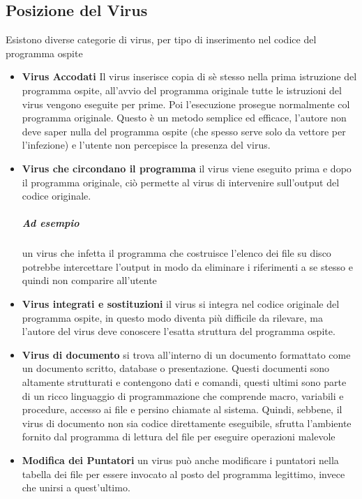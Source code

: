 \subsection{Posizione del Virus}
Esistono diverse categorie di virus, per tipo di inserimento nel codice del programma ospite
\begin{itemize}
\item \textbf{Virus Accodati} Il virus inserisce copia di sè stesso nella prima istruzione del programma ospite, all'avvio del programma originale tutte le istruzioni del virus vengono eseguite per prime. Poi l'esecuzione prosegue normalmente col programma originale. Questo è un metodo semplice ed efficace, l'autore non deve saper nulla del programma ospite (che spesso serve solo da vettore per l'infezione) e l'utente non percepisce la presenza del virus.
\item \textbf{Virus che circondano il programma} il virus viene eseguito prima e dopo il programma originale, ciò permette al virus di intervenire sull'output del codice originale.
\subparagraph{Ad esempio} un virus che infetta il programma che costruisce l'elenco dei file su disco potrebbe intercettare l'output in modo da eliminare i riferimenti a se stesso e quindi non comparire all'utente
\item \textbf{Virus integrati e sostituzioni} il virus si integra nel codice originale del programma ospite, in questo modo diventa più difficile da rilevare, ma l'autore del virus deve conoscere l'esatta struttura del programma ospite.
\item \textbf{Virus di documento} si trova all'interno di un documento formattato come un documento scritto, database o presentazione. Questi documenti sono altamente strutturati e contengono dati e comandi, questi ultimi sono parte di un ricco linguaggio di programmazione che comprende macro, variabili e procedure, accesso ai file e persino chiamate al sistema. Quindi, sebbene, il virus di documento non sia codice direttamente eseguibile, sfrutta l'ambiente fornito dal programma di lettura del file per eseguire operazioni malevole
\item \textbf{Modifica dei Puntatori} un virus può anche modificare i puntatori nella tabella dei file per essere invocato al posto del programma legittimo, invece che unirsi a quest'ultimo.
\end{itemize}

